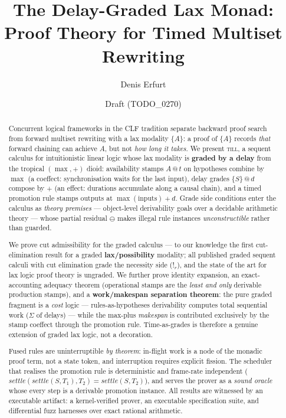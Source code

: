 \documentclass[11pt]{article}
\title{The Delay-Graded Lax Monad:\\
  Proof Theory for Timed Multiset Rewriting}
\author{Denis Erfurt}
\date{Draft (TODO\_0270)}
\makeatletter
\newcommand{\lax}[2]{\{#1\}\mathbin{@}#2}       %
\newcommand{\gbang}[1]{{!}_{#1}}                 %
\newcommand{\res}{\mathbin{\ominus}}             %
\newcommand{\stmp}[2]{#1\mathbin{@}#2}           %
\newcommand{\settle}{\mathit{settle}}
\newcommand{\till}{\textsc{till}}                %
\theoremstyle{definition}
\theoremstyle{remark}
\makeatother
\begin{document}
\maketitle

\begin{abstract}
Concurrent logical frameworks in the CLF tradition separate backward proof
search from forward multiset rewriting with a lax modality $\{A\}$: a proof of
$\{A\}$ records \emph{that} forward chaining can achieve $A$, but not
\emph{how long it takes}.  We present \till{}, a sequent calculus for
intuitionistic linear logic whose lax modality is \textbf{graded by a delay}
from the tropical $(\max,{+})$ dioid: availability stamps $\stmp{A}{t}$ on
hypotheses combine by $\max$ (a coeffect: synchronisation waits for the last
input), delay grades $\lax{S}{d}$ compose by $+$ (an effect: durations
accumulate along a causal chain), and a timed promotion rule stamps outputs at
$\max(\text{inputs})+d$.  Grade side conditions enter the calculus as
\emph{theory premises} --- object-level derivability goals over a decidable
arithmetic theory --- whose partial residual $\res$ makes illegal rule
instances \emph{unconstructible} rather than guarded.

We prove cut admissibility for the graded calculus --- to our knowledge the
first cut-elimination result for a graded \textbf{lax/possibility} modality;
all published graded sequent calculi with cut elimination grade the necessity
side ($\gbang{r}$), and the state of the art for lax logic proof theory is
ungraded.  We further prove identity expansion, an exact-accounting adequacy
theorem (operational stamps are the \emph{least and only} derivable production
stamps), and a \textbf{work/makespan separation theorem}: the pure graded
fragment is a \emph{cost} logic --- rules-as-hypotheses derivability computes
total sequential work ($\Sigma$ of delays) --- while the max-plus
\emph{makespan} is contributed exclusively by the stamp coeffect through the
promotion rule.  Time-as-grades is therefore a genuine extension of graded lax
logic, not a decoration.

Fused rules are uninterruptible \emph{by theorem}: in-flight work is a node of
the monadic proof term, not a state token, and interruption requires explicit
fission.  The scheduler that realises the promotion rule is deterministic and
frame-rate independent ($\settle(\settle(S,T_1),T_2) = \settle(S,T_2)$), and
serves the prover as a \emph{sound oracle} whose every step is a derivable
promotion instance.  All results are witnessed by an executable artifact: a
kernel-verified prover, an executable specification suite, and differential
fuzz harnesses over exact rational arithmetic.
\end{abstract}
\end{document}
